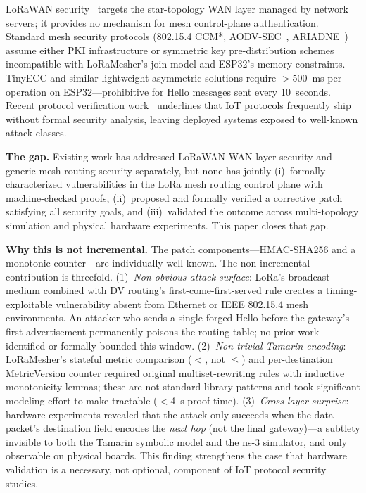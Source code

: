 \documentclass[10pt,journal,compsoc]{IEEEtran}
\begin{document}
LoRaWAN security~\cite{ieee2025-lorawan-key-vulnerability,ieee2025-lorawan-key-verification,mohamed2022-lorawan-gateways,butun2019-lorawan-security-risk}
targets the star-topology WAN layer managed by network servers;
it provides no mechanism for mesh control-plane authentication.
Standard mesh security protocols (802.15.4 CCM*, AODV-SEC~\cite{hu2002-sead},
ARIADNE~\cite{hu2002-ariadne}) assume either PKI infrastructure or symmetric key
pre-distribution schemes incompatible with LoRaMesher's join model
and ESP32's memory constraints. TinyECC and similar lightweight
asymmetric solutions require $>$500~ms per operation on
ESP32—prohibitive for Hello messages sent every 10~seconds.
Recent protocol verification work~\cite{duttagupta2025-matter-security,casagrande2025-iot-protocol-attacks}
underlines that IoT protocols frequently ship without formal
security analysis, leaving deployed systems exposed to
well-known attack classes.

\textbf{The gap.} Existing work has addressed LoRaWAN WAN-layer
security and generic mesh routing security separately, but none has
jointly (i)~formally characterized vulnerabilities in the LoRa mesh
routing control plane with machine-checked proofs, (ii)~proposed
and formally verified a corrective patch satisfying all security
goals, and (iii)~validated the outcome across multi-topology
simulation and physical hardware experiments. This paper closes
that gap.

\textbf{Why this is not incremental.}
The patch components—HMAC-SHA256 and a monotonic counter—are
individually well-known. The non-incremental contribution is
threefold.
(1)~\emph{Non-obvious attack surface}: LoRa's broadcast medium
combined with DV routing's first-come-first-served rule creates a
timing-exploitable vulnerability absent from Ethernet or IEEE
802.15.4 mesh environments. An attacker who sends a single forged
Hello before the gateway's first advertisement permanently poisons
the routing table; no prior work identified or formally bounded
this window.
(2)~\emph{Non-trivial Tamarin encoding}: LoRaMesher's stateful metric
comparison ($<$, not $\leq$) and per-destination MetricVersion
counter required original multiset-rewriting rules with inductive
monotonicity lemmas; these are not standard library patterns and
took significant modeling effort to make tractable ($<$4~s proof time).
(3)~\emph{Cross-layer surprise}: hardware experiments revealed that
the attack only succeeds when the data packet's destination field
encodes the \emph{next hop} (not the final gateway)—a subtlety
invisible to both the Tamarin symbolic model and the ns-3 simulator,
and only observable on physical boards. This finding strengthens the
case that hardware validation is a necessary, not optional, component
of IoT protocol security studies.
\end{document}
